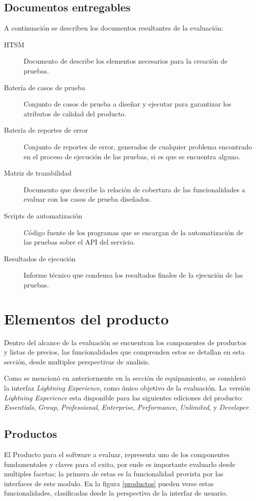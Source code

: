\subsection{Documentos entregables}
A continuación se describen los documentos resultantes de la evaluación:

\begin{description}
\item [HTSM] Documento de describe los elementos necesarios para la creación de
    pruebas.
\item [Batería de casos de prueba] Conjunto de casos de prueba a diseñar y
    ejecutar para garantizar los atributos de calidad del producto.
\item [Batería de reportes de error] Conjunto de reportes de error, generados de
    cualquier problema encontrado en el proceso de ejecución de las pruebas, si
    es que se encuentra alguno.
\item [Matriz de trazabilidad] Documento que describe la relación de cobertura
    de las funcionalidades a evaluar con los casos de prueba diseñados.
\item [Scripts de automatización] Código fuente de los programas que se encargan
    de la automatización de las pruebas sobre el API del servicio.
\item [Resultados de ejecución] Informe técnico que condensa los resultados
    finales de la ejecución de las pruebas.
\end{description}

\section{Elementos del producto}
Dentro del alcance de la evaluación se encuentran los componentes de productos
y listas de precios, las funcionalidades que comprenden estos se detallan en
esta sección, desde multiples perspectivas de analisis.

Como se mencionó en anteriormente en la sección de equipamiento, se consideró la
interfaz \emph{Lightning Experience}, como único objetivo de la evaluación. La
versión \emph{Lightning Experience} esta disponible para las siguientes
ediciones del producto: \emph{Essentials}, \emph{Group}, \emph{Professional},
\emph{Enterprise}, \emph{Performance}, \emph{Unlimited}, y \emph{Developer}.

\subsection{Productos}
El Producto para el software a evaluar, representa uno de los componentes
fundamentales y claves para el exito, por ende es importante evaluarlo
desde multiples facetas; la primera de estas es la funcionalidad provista por
las interfaces de este modulo. En la figura \ref{productos} pueden verse estas
funcionalidades, clasificadas desde la perspectiva de la interfaz de usuario.

